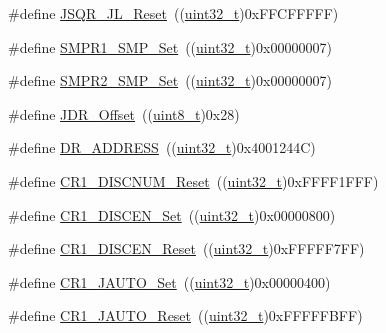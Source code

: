 \begin{DoxyCompactItemize}
\item 
\#define \hyperlink{group___a_d_c___private___defines_gac8d1173791ea10bac7c53a368d593a16}{J\+S\+Q\+R\+\_\+\+J\+L\+\_\+\+Reset}~((\hyperlink{_p_e___types_8h_a33594304e786b158f3fb30289278f5af}{uint32\+\_\+t})0x\+F\+F\+C\+F\+F\+F\+F\+F)
\item 
\#define \hyperlink{group___a_d_c___private___defines_ga244048ec3ba9461a6609942def9a15ba}{S\+M\+P\+R1\+\_\+\+S\+M\+P\+\_\+\+Set}~((\hyperlink{_p_e___types_8h_a33594304e786b158f3fb30289278f5af}{uint32\+\_\+t})0x00000007)
\item 
\#define \hyperlink{group___a_d_c___private___defines_ga6555beb1970c42125678d80530bba4d3}{S\+M\+P\+R2\+\_\+\+S\+M\+P\+\_\+\+Set}~((\hyperlink{_p_e___types_8h_a33594304e786b158f3fb30289278f5af}{uint32\+\_\+t})0x00000007)
\item 
\#define \hyperlink{group___a_d_c___private___defines_ga5671a68d6f0d01c6c465ee7a3a8f3eea}{J\+D\+R\+\_\+\+Offset}~((\hyperlink{_p_e___types_8h_aba7bc1797add20fe3efdf37ced1182c5}{uint8\+\_\+t})0x28)
\item 
\#define \hyperlink{group___a_d_c___private___defines_ga35ecb1c96cfae175f5f00490e5e91e88}{D\+R\+\_\+\+A\+D\+D\+R\+E\+SS}~((\hyperlink{_p_e___types_8h_a33594304e786b158f3fb30289278f5af}{uint32\+\_\+t})0x4001244\+C)
\item 
\#define \hyperlink{group___a_d_c___private___defines_ga88cecf0c336d950115d7a52d599de816}{C\+R1\+\_\+\+D\+I\+S\+C\+N\+U\+M\+\_\+\+Reset}~((\hyperlink{_p_e___types_8h_a33594304e786b158f3fb30289278f5af}{uint32\+\_\+t})0x\+F\+F\+F\+F1\+F\+F\+F)
\item 
\#define \hyperlink{group___a_d_c___private___defines_ga95f4f653adde3407c116919c2b7d9c74}{C\+R1\+\_\+\+D\+I\+S\+C\+E\+N\+\_\+\+Set}~((\hyperlink{_p_e___types_8h_a33594304e786b158f3fb30289278f5af}{uint32\+\_\+t})0x00000800)
\item 
\#define \hyperlink{group___a_d_c___private___defines_ga959f617e77853bff85ca5e8d6fba6611}{C\+R1\+\_\+\+D\+I\+S\+C\+E\+N\+\_\+\+Reset}~((\hyperlink{_p_e___types_8h_a33594304e786b158f3fb30289278f5af}{uint32\+\_\+t})0x\+F\+F\+F\+F\+F7\+F\+F)
\item 
\#define \hyperlink{group___a_d_c___private___defines_gaa8478f12e212738e249a7fafb69d4dd4}{C\+R1\+\_\+\+J\+A\+U\+T\+O\+\_\+\+Set}~((\hyperlink{_p_e___types_8h_a33594304e786b158f3fb30289278f5af}{uint32\+\_\+t})0x00000400)
\item 
\#define \hyperlink{group___a_d_c___private___defines_gab6c4a9f0a661bf7c5add35ea3a90b756}{C\+R1\+\_\+\+J\+A\+U\+T\+O\+\_\+\+Reset}~((\hyperlink{_p_e___types_8h_a33594304e786b158f3fb30289278f5af}{uint32\+\_\+t})0x\+F\+F\+F\+F\+F\+B\+F\+F)

\end{DoxyCompactItemize}
